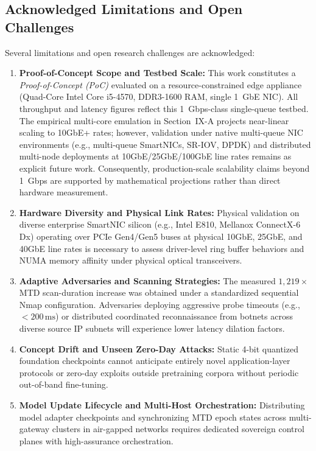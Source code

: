 \documentclass[journal]{IEEEtran}
\renewcommand{\_}{\textunderscore\allowbreak}
\begin{document}
\subsection{Acknowledged Limitations and Open Challenges}
Several limitations and open research challenges are acknowledged:
\begin{enumerate}
  \item \textbf{Proof-of-Concept Scope and Testbed Scale:} This work constitutes a
  \textit{Proof-of-Concept (PoC)} evaluated on a resource-constrained edge appliance
  (Quad-Core Intel Core i5-4570, DDR3-1600 RAM, single 1~GbE NIC). All throughput and
  latency figures reflect this 1~Gbps-class single-queue testbed. The empirical multi-core
  emulation in Section~IX-A projects near-linear scaling to 10GbE+ rates; however,
  validation under native multi-queue NIC environments (e.g., multi-queue SmartNICs,
  SR-IOV, DPDK) and distributed multi-node deployments at 10GbE/25GbE/100GbE line rates
  remains as explicit future work. Consequently, production-scale scalability claims beyond
  1~Gbps are supported by mathematical projections rather than direct hardware measurement.
  \item \textbf{Hardware Diversity and Physical Link Rates:} Physical validation on diverse
  enterprise SmartNIC silicon (e.g., Intel E810, Mellanox ConnectX-6 Dx) operating over
  PCIe Gen4/Gen5 buses at physical 10GbE, 25GbE, and 40GbE line rates is necessary to assess
  driver-level ring buffer behaviors and NUMA memory affinity under physical optical transceivers.
  \item \textbf{Adaptive Adversaries and Scanning Strategies:} The measured $1{,}219\times$
  MTD scan-duration increase was obtained under a standardized sequential Nmap configuration.
  Adversaries deploying aggressive probe timeouts (e.g., $< 200\,\text{ms}$) or distributed
  coordinated reconnaissance from botnets across diverse source IP subnets will experience
  lower latency dilation factors.
  \item \textbf{Concept Drift and Unseen Zero-Day Attacks:} Static 4-bit quantized foundation
  checkpoints cannot anticipate entirely novel application-layer protocols or zero-day exploits
  outside pretraining corpora without periodic out-of-band fine-tuning.
  \item \textbf{Model Update Lifecycle and Multi-Host Orchestration:} Distributing model
  adapter checkpoints and synchronizing MTD epoch states across multi-gateway clusters in
  air-gapped networks requires dedicated sovereign control planes with high-assurance orchestration.

\end{enumerate}
\end{document}
